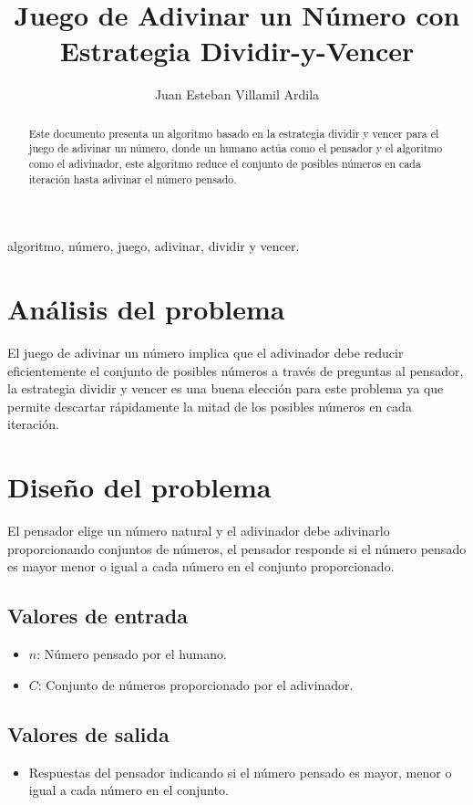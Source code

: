 \documentclass[twoside,spanish]{elsarticle}
\begin{document}
\begin{frontmatter}{}
\title{Juego de Adivinar un Número con Estrategia Dividir-y-Vencer}
\author[lfv]{Juan Esteban Villamil Ardila}
\address[lfv]{Pontificia Universidad Javeriana, Bogotá, Colombia}
\begin{abstract}
Este documento presenta un algoritmo basado en la estrategia dividir y vencer para el juego de adivinar un número, donde un humano actúa como el pensador y el algoritmo como el adivinador, este algoritmo reduce el conjunto de posibles números en cada iteración hasta adivinar el número pensado.
\end{abstract}
\begin{keyword}
algoritmo, número, juego, adivinar, dividir y vencer.
\end{keyword}
\end{frontmatter}{}

\section{Análisis del problema}
El juego de adivinar un número implica que el adivinador debe reducir eficientemente el conjunto de posibles números a través de preguntas al pensador, la estrategia dividir y vencer es una buena elección  para este problema ya que permite descartar rápidamente la mitad de los posibles números en cada iteración.

\section{Diseño del problema}
El pensador elige un número natural y el adivinador debe adivinarlo proporcionando conjuntos de números, el pensador responde si el número pensado es mayor menor o igual a cada número en el conjunto proporcionado.

\subsection{Valores de entrada}
\begin{itemize}
\item $n$: Número pensado por el humano.
\item $C$: Conjunto de números proporcionado por el adivinador.
\end{itemize}

\subsection{Valores de salida}
\begin{itemize}
\item Respuestas del pensador indicando si el número pensado es mayor, menor o igual a cada número en el conjunto.
\end{itemize}
\end{document}
